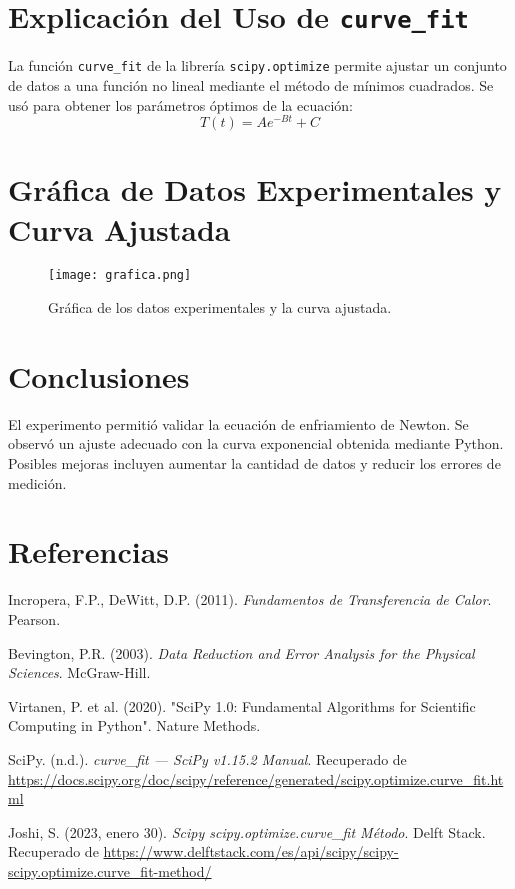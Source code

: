 \documentclass[a4paper,12pt]{article}
\begin{document}
\section{Explicación del Uso de \texttt{curve\_fit}}
La función \texttt{curve\_fit} de la librería \texttt{scipy.optimize} permite ajustar un conjunto de datos a una función no lineal mediante el método de mínimos cuadrados. Se usó para obtener los parámetros óptimos de la ecuación:
\begin{equation}
    T(t) = A e^{-Bt} + C
\end{equation}

\section{Gráfica de Datos Experimentales y Curva Ajustada}
\begin{figure}[H]
    \centering
    \texttt{[image: grafica.png]} 
    \caption{Gráfica de los datos experimentales y la curva ajustada.}
\end{figure}

\section{Conclusiones}
El experimento permitió validar la ecuación de enfriamiento de Newton. Se observó un ajuste adecuado con la curva exponencial obtenida mediante Python. Posibles mejoras incluyen aumentar la cantidad de datos y reducir los errores de medición.

\section{Referencias}
\begin{thebibliography}{9}

     Incropera, F.P., DeWitt, D.P. (2011). \textit{Fundamentos de Transferencia de Calor}. Pearson.

     Bevington, P.R. (2003). \textit{Data Reduction and Error Analysis for the Physical Sciences}. McGraw-Hill.

     Virtanen, P. et al. (2020). "SciPy 1.0: Fundamental Algorithms for Scientific Computing in Python". Nature Methods.

     SciPy. (n.d.). \textit{curve\_fit — SciPy v1.15.2 Manual}. Recuperado de  
    \url{https://docs.scipy.org/doc/scipy/reference/generated/scipy.optimize.curve_fit.html}

     Joshi, S. (2023, enero 30). \textit{Scipy scipy.optimize.curve\_fit Método}. Delft Stack. Recuperado de  
    \url{https://www.delftstack.com/es/api/scipy/scipy-scipy.optimize.curve_fit-method/}

\end{thebibliography}
\end{document}
